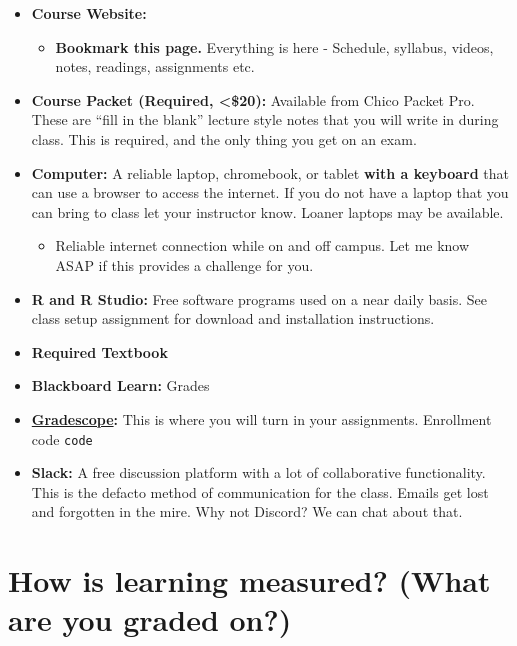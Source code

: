 \documentclass[
]{article}
\providecommand{\tightlist}{%
  \setlength{\itemsep}{0pt}\setlength{\parskip}{0pt}}
\begin{document}
\begin{itemize}
\tightlist
\item
  \textbf{Course Website:}

  \begin{itemize}
  \tightlist
  \item
    {\textbf{Bookmark this page.}} Everything is here - Schedule,
    syllabus, videos, notes, readings, assignments etc.
  \end{itemize}
\item
  \textbf{Course Packet (Required, \textless\$20):} Available from Chico
  Packet Pro. These are ``fill in the blank'' lecture style notes that
  you will write in during class. This is required, and the only thing
  you get on an exam.
\item
  \textbf{Computer:} A reliable laptop, chromebook, or tablet
  \textbf{with a keyboard} that can use a browser to access the
  internet. If you do not have a laptop that you can bring to class let
  your instructor know. Loaner laptops may be available.

  \begin{itemize}
  \tightlist
  \item
    Reliable internet connection while on and off campus. Let me know
    ASAP if this provides a challenge for you.
  \end{itemize}
\item
  \textbf{R and R Studio:} Free software programs used on a near daily
  basis. See class setup assignment for download and installation
  instructions.
\item
  \textbf{Required Textbook}
\item
  \textbf{Blackboard Learn:} Grades
\item
  \textbf{\href{https://www.gradescope.com/}{Gradescope}:} This is where
  you will turn in your assignments. Enrollment code \texttt{code}
\item
  \textbf{Slack:} A free discussion platform with a lot of collaborative
  functionality. This is the defacto method of communication for the
  class. Emails get lost and forgotten in the mire. Why not Discord? We
  can chat about that.
\end{itemize}

\hypertarget{how-is-learning-measured-what-are-you-graded-on}{%
\section{How is learning measured? (What are you graded
on?)}\label{how-is-learning-measured-what-are-you-graded-on}}
\end{document}
